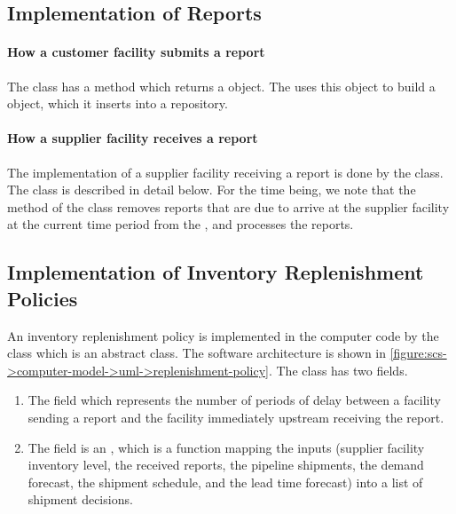 \subsection{Implementation of Reports}

\paragraph{How a customer facility submits a report}
The  class has a method 
which returns a  object.
The  uses this object
to build a  object,
which it inserts into a  repository.

\paragraph{How a supplier facility receives a report}
The implementation of a supplier facility receiving a report
is done by the  class.
The class is described in detail below.
For the time being,
we note that the method 
of the  class
removes reports that are due to arrive at the
supplier facility at the current time period
from the ,
and processes the reports.





\subsection{Implementation of Inventory Replenishment Policies}

An inventory replenishment policy is implemented in the computer code
by the class  which is an abstract class.
The software architecture is shown in
\autoref{figure:scs->computer-model->uml->replenishment-policy}.
The class has two fields.
\begin{enumerate}
\item
The field 
which represents the number of periods of delay
between a facility sending a report
and the facility immediately upstream receiving the report.
\item
The field 
is an ,
which is a function mapping the inputs
(supplier facility inventory level,
the received reports,
the pipeline shipments,
the demand forecast,
the shipment schedule,
and the lead time forecast)
into a list of shipment decisions.
\end{enumerate}

